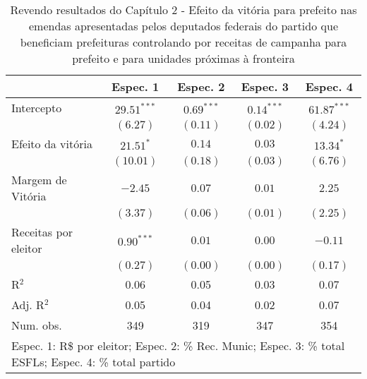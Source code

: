 
\begin{table}
\caption{Revendo resultados do Capítulo 2 - Efeito da vitória para prefeito nas emendas apresentadas pelos deputados federais do partido que beneficiam prefeituras controlando por receitas de campanha para prefeito e para unidades próximas à fronteira}
\begin{center}
\begin{tabular}{l c c c c }
\hline
                     & Espec. 1 & Espec. 2 & Espec. 3 & Espec. 4 \\
\hline
Intercepto           & $29.51^{***}$ & $0.69^{***}$ & $0.14^{***}$ & $61.87^{***}$ \\
                     & $(6.27)$      & $(0.11)$     & $(0.02)$     & $(4.24)$      \\
Efeito da vitória    & $21.51^{*}$   & $0.14$       & $0.03$       & $13.34^{*}$   \\
                     & $(10.01)$     & $(0.18)$     & $(0.03)$     & $(6.76)$      \\
Margem de Vitória    & $-2.45$       & $0.07$       & $0.01$       & $2.25$        \\
                     & $(3.37)$      & $(0.06)$     & $(0.01)$     & $(2.25)$      \\
Receitas por eleitor & $0.90^{***}$  & $0.01$       & $0.00$       & $-0.11$       \\
                     & $(0.27)$      & $(0.00)$     & $(0.00)$     & $(0.17)$      \\
\hline
R$^2$                & 0.06          & 0.05         & 0.03         & 0.07          \\
Adj. R$^2$           & 0.05          & 0.04         & 0.02         & 0.07          \\
Num. obs.            & 349           & 319          & 347          & 354           \\
\hline
\multicolumn{5}{l}{\scriptsize{Espec. 1: R\$ por eleitor; Espec. 2: \% Rec. Munic; Espec. 3: \% total ESFLs; Espec. 4: \% total partido}}
\end{tabular}
\label{tab:c4t6}
\end{center}
\end{table}

